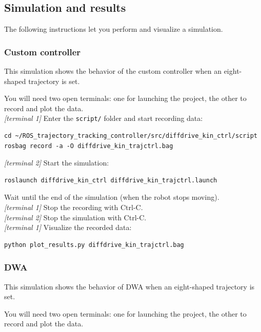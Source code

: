 \documentclass[11pt,a4paper]{article}
\begin{document}
\subsection{Simulation and results}

The following instructions let you perform and visualize a simulation.

\subsubsection{Custom controller}

This simulation shows the behavior of the custom controller when an eight-shaped trajectory is set.

You will need two open terminals: one for launching the project, the other to record and plot the data.\\

\textit{[terminal 1]} Enter the \texttt{script/} folder and start recording data:
\begin{lstlisting}
cd ~/ROS_trajectory_tracking_controller/src/diffdrive_kin_ctrl/script
rosbag record -a -O diffdrive_kin_trajctrl.bag
\end{lstlisting}

\textit{[terminal 2]} Start the simulation:
\begin{lstlisting}
roslaunch diffdrive_kin_ctrl diffdrive_kin_trajctrl.launch
\end{lstlisting}

Wait until the end of the simulation (when the robot stops moving).\\

\textit{[terminal 1]} Stop the recording with Ctrl-C.\\

\textit{[terminal 2]} Stop the simulation with Ctrl-C.\\

\textit{[terminal 1]} Visualize the recorded data:
\begin{lstlisting}
python plot_results.py diffdrive_kin_trajctrl.bag
\end{lstlisting}

\subsubsection{DWA}

This simulation shows the behavior of DWA when an eight-shaped trajectory is set.

You will need two open terminals: one for launching the project, the other to record and plot the data.\\
\end{document}
